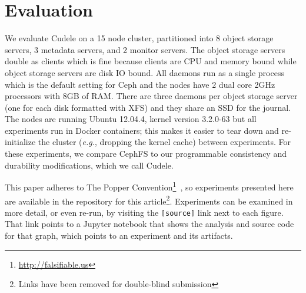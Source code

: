 \section{Evaluation}
\label{sec:evaluation}

We evaluate Cudele on a 15 node cluster, partitioned into 8 object storage
servers, 3 metadata servers, and 2 monitor servers. The object storage servers
double as clients which is fine because clients are CPU and memory bound while
object storage servers are disk IO bound. All daemons run as a single process
which is the default setting for Ceph and the nodes have 2 dual core 2GHz
processors with 8GB of RAM. There are three daemons per object storage server
(one for each disk formatted with XFS) and they share an SSD for the journal.
The nodes are running Ubuntu 12.04.4, kernel version 3.2.0-63 but all
experiments run in Docker containers; this makes it easier to tear down and
re-initialize the cluster ({\it e.g.}, dropping the kernel cache) between
experiments. For these experiments, we compare CephFS to our programmable
consistency and durability modifications, which we call Cudele.

This paper adheres to The Popper
Convention\footnote{\url{http://falsifiable.us}}~\cite{jimenez_popper_2016}, so
experiments presented here are available in the repository for this
article\footnote{Links have been removed for double-blind submission}.
Experiments can be examined in more detail, or even re-run, by visiting the
\texttt{[source]} link next to each figure. That link points to a Jupyter
notebook that shows the analysis and source code for that graph, which points
to an experiment and its artifacts.


